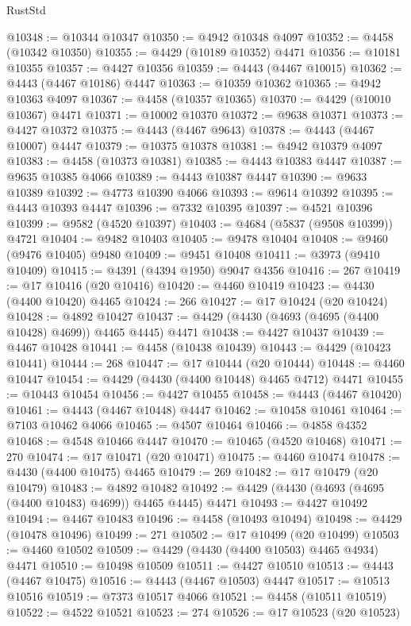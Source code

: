 \begin{lexlean}{RustStd}
\begin{coremodule}
{\begin{coremodule}
{{{{{{{{{{{{{{{{{{{{{{{{{{{{{{{{{{{{{{{{{{{{{{{{{{{{{{{{{{{{{{{{{{{{@10348 := @10344 @10347
@10350 := @4942 @10348 @4097
@10352 := @4458 (@10342 @10350)
@10355 := @4429 (@10189 @10352) @4471
@10356 := @10181 @10355
@10357 := @4427 @10356
@10359 := @4443 (@4467 @10015)
@10362 := @4443 (@4467 @10186) @4447
@10363 := @10359 @10362
@10365 := @4942 @10363 @4097
@10367 := @4458 (@10357 @10365)
@10370 := @4429 (@10010 @10367) @4471
@10371 := @10002 @10370
@10372 := @9638 @10371
@10373 := @4427 @10372
@10375 := @4443 (@4467 @9643)
@10378 := @4443 (@4467 @10007) @4447
@10379 := @10375 @10378
@10381 := @4942 @10379 @4097
@10383 := @4458 (@10373 @10381)
@10385 := @4443 @10383 @4447
@10387 := @9635 @10385 @4066
@10389 := @4443 @10387 @4447
@10390 := @9633 @10389
@10392 := @4773 @10390 @4066
@10393 := @9614 @10392
@10395 := @4443 @10393 @4447
@10396 := @7332 @10395
@10397 := @4521 @10396
@10399 := @9582 (@4520 @10397)
@10403 := @4684 (@5837 (@9508 @10399)) @4721
@10404 := @9482 @10403
@10405 := @9478 @10404
@10408 := @9460 (@9476 @10405) @9480
@10409 := @9451 @10408
@10411 := @3973 (@9410 @10409)
@10415 := @4391 (@4394 @1950) @9047 @4356
@10416 := 267
@10419 := @17 @10416 (@20 @10416)
@10420 := @4460 @10419
@10423 := @4430 (@4400 @10420) @4465
@10424 := 266
@10427 := @17 @10424 (@20 @10424)
@10428 := @4892 @10427
@10437 := @4429 (@4430 (@4693 (@4695 (@4400 @10428) @4699)) @4465 @4445) @4471
@10438 := @4427 @10437
@10439 := @4467 @10428
@10441 := @4458 (@10438 @10439)
@10443 := @4429 (@10423 @10441)
@10444 := 268
@10447 := @17 @10444 (@20 @10444)
@10448 := @4460 @10447
@10454 := @4429 (@4430 (@4400 @10448) @4465 @4712) @4471
@10455 := @10443 @10454
@10456 := @4427 @10455
@10458 := @4443 (@4467 @10420)
@10461 := @4443 (@4467 @10448) @4447
@10462 := @10458 @10461
@10464 := @7103 @10462 @4066
@10465 := @4507 @10464
@10466 := @4858 @4352
@10468 := @4548 @10466 @4447
@10470 := @10465 (@4520 @10468)
@10471 := 270
@10474 := @17 @10471 (@20 @10471)
@10475 := @4460 @10474
@10478 := @4430 (@4400 @10475) @4465
@10479 := 269
@10482 := @17 @10479 (@20 @10479)
@10483 := @4892 @10482
@10492 := @4429 (@4430 (@4693 (@4695 (@4400 @10483) @4699)) @4465 @4445) @4471
@10493 := @4427 @10492
@10494 := @4467 @10483
@10496 := @4458 (@10493 @10494)
@10498 := @4429 (@10478 @10496)
@10499 := 271
@10502 := @17 @10499 (@20 @10499)
@10503 := @4460 @10502
@10509 := @4429 (@4430 (@4400 @10503) @4465 @4934) @4471
@10510 := @10498 @10509
@10511 := @4427 @10510
@10513 := @4443 (@4467 @10475)
@10516 := @4443 (@4467 @10503) @4447
@10517 := @10513 @10516
@10519 := @7373 @10517 @4066
@10521 := @4458 (@10511 @10519)
@10522 := @4522 @10521
@10523 := 274
@10526 := @17 @10523 (@20 @10523)
}}}}}}}}}}}}}}}}}}}}}}}}}}}}}}}}}}}}}}}}}}}}}}}}}}}}}}}}}}}}}}}}}}}}
\end{coremodule}}
\end{coremodule}
\end{lexlean}
